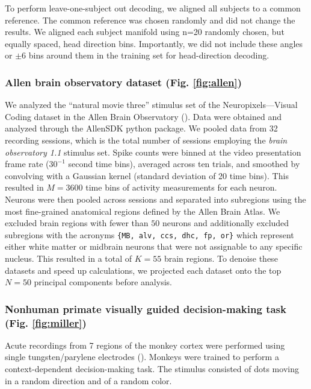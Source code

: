 To perform leave-one-subject out decoding, we aligned all subjects to a common reference. The common reference was chosen randomly and did not change the results. We aligned each subject manifold using n=20 randomly chosen, but equally spaced, head direction bins. Importantly, we did not include these angles or $\pm$6 bins around them in the training set for head-direction decoding.

\subsubsection{Allen brain observatory dataset (Fig. \ref{fig:allen})}

We analyzed the ``natural movie three'' stimulus set of the Neuropixels---Visual Coding dataset in the Allen Brain Observatory (\cite{Siegle2021-hs}).
Data were obtained and analyzed through the AllenSDK python package.
We pooled data from 32 recording sessions, which is the total number of sessions employing the \textit{brain observatory 1.1} stimulus set.
Spike counts were binned at the video presentation frame rate ($30^{-1}$ second time bins), averaged across ten trials, and smoothed by convolving with a Gaussian kernel (standard deviation of 20 time bins).
This resulted in $M=3600$ time bins of activity measurements for each neuron.
Neurons were then pooled across sessions and separated into subregions using the most fine-grained anatomical regions defined by the Allen Brain Atlas.
We excluded brain regions with fewer than $50$ neurons and additionally excluded subregions with the acronyms \texttt{\{MB, alv, ccs, dhc, fp, or\}} which represent either white matter or midbrain neurons that were not assignable to any specific nucleus.
This resulted in a total of $K=55$ brain regions.
To denoise these datasets and speed up calculations, we projected each dataset onto the top $N=50$ principal components before analysis.

\subsubsection{Nonhuman primate visually guided decision-making task (Fig. \ref{fig:miller})}

Acute recordings from 7 regions of the monkey cortex were performed using single tungsten/parylene electrodes (\cite{Siegel2015-cz}). Monkeys were trained to perform a context-dependent decision-making task. The stimulus consisted of dots moving in a random direction and of a random color. 

